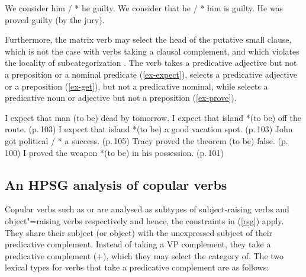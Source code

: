 \eal
\ex We consider him / * he guilty.
\ex We consider that he / * him is guilty.
\ex He was proved guilty (by the jury).	
\zl
	

Furthermore, the matrix verb may select the head of the putative small clause, which is not the case
with verbs taking a clausal complement, and which violates the 
locality of subcategorization \citep[]{PollardandSag1994}. The
verb  takes a predicative adjective but not a preposition or a nominal predicate (\ref{ex-expect}),
 selects a predicative adjective or a preposition (\ref{ex-get}), but not a predicative nominal, while
 selects a predicative noun or adjective but not a preposition (\ref{ex-prove}).


\eal
\label{ex-expect}
\ex I expect that man (to be) dead  by tomorrow. \citep[]{PollardandSag1994}
\ex I expect that island *(to be) off the route. (p.\,103)
\ex I expect that island *(to be) a good vacation spot. (p.\,103)
\zl
\ea
\label{ex-get}
John got political / * a success. (p.\,105)	
\z
\eal
\label{ex-prove}
\ex Tracy proved the theorem (to be) false. (p.\,100)
\ex I proved the weapon *(to be) in his possession.	(p.\,101)
\zl
	


\subsection{An HPSG analysis of copular verbs}
\label{control-sec-copula-verbs}
	
Copular verbs such as  or  are analysed as subtypes of subject-raising verbs
and object"=raising verbs respectively and hence, the constraints in (\ref{rsg}) apply. They share their subject (or object) with the
unexpressed subject of their predicative complement. Instead of taking a VP complement, they take a
predicative complement (\prd $+$), which they may select the category of.  The two lexical types for
verbs that take a predicative complement are as follows:

\eal
\label{ex-subj-pred-v}
\ex {} \impl\\
\ex {} \impl\\ 
\zl

